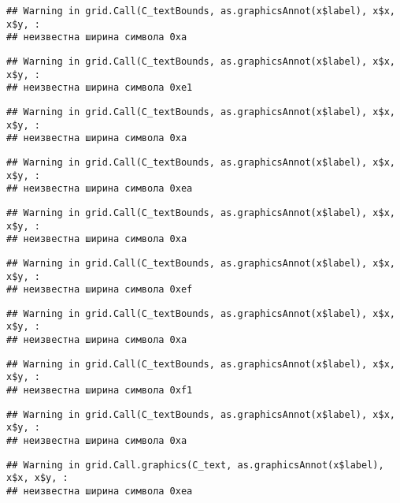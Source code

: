 \documentclass[
]{article}
\begin{document}
\begin{verbatim}
## Warning in grid.Call(C_textBounds, as.graphicsAnnot(x$label), x$x, x$y, :
## неизвестна ширина символа 0xa
\end{verbatim}

\begin{verbatim}
## Warning in grid.Call(C_textBounds, as.graphicsAnnot(x$label), x$x, x$y, :
## неизвестна ширина символа 0xe1
\end{verbatim}

\begin{verbatim}
## Warning in grid.Call(C_textBounds, as.graphicsAnnot(x$label), x$x, x$y, :
## неизвестна ширина символа 0xa
\end{verbatim}

\begin{verbatim}
## Warning in grid.Call(C_textBounds, as.graphicsAnnot(x$label), x$x, x$y, :
## неизвестна ширина символа 0xea
\end{verbatim}

\begin{verbatim}
## Warning in grid.Call(C_textBounds, as.graphicsAnnot(x$label), x$x, x$y, :
## неизвестна ширина символа 0xa
\end{verbatim}

\begin{verbatim}
## Warning in grid.Call(C_textBounds, as.graphicsAnnot(x$label), x$x, x$y, :
## неизвестна ширина символа 0xef
\end{verbatim}

\begin{verbatim}
## Warning in grid.Call(C_textBounds, as.graphicsAnnot(x$label), x$x, x$y, :
## неизвестна ширина символа 0xa
\end{verbatim}

\begin{verbatim}
## Warning in grid.Call(C_textBounds, as.graphicsAnnot(x$label), x$x, x$y, :
## неизвестна ширина символа 0xf1
\end{verbatim}

\begin{verbatim}
## Warning in grid.Call(C_textBounds, as.graphicsAnnot(x$label), x$x, x$y, :
## неизвестна ширина символа 0xa
\end{verbatim}

\begin{verbatim}
## Warning in grid.Call.graphics(C_text, as.graphicsAnnot(x$label), x$x, x$y, :
## неизвестна ширина символа 0xea
\end{verbatim}
\end{document}
